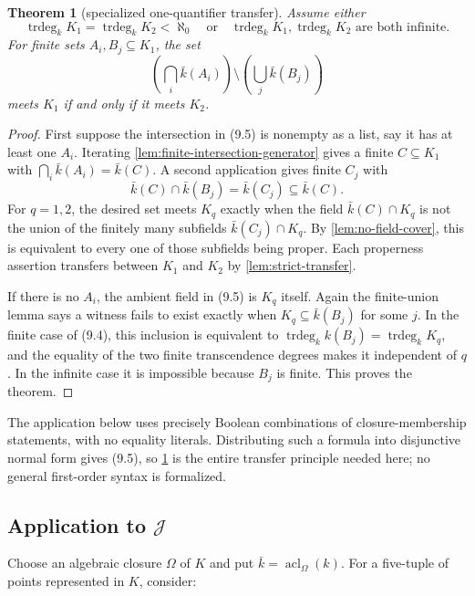 \documentclass[11pt,oneside]{article}
\newtheorem{theorem}{Theorem}[section]
\theoremstyle{definition}
\theoremstyle{remark}
\newcommand{\acl}{\operatorname{acl}}
\newcommand{\trdeg}{\operatorname{trdeg}}
\newcommand{\Jrel}{\mathcal{J}}
\begin{document}
\begin{theorem}[specialized one-quantifier transfer]\label{thm:one-quantifier-transfer}
Assume either
\[
 \trdeg_kK_1=\trdeg_kK_2<\aleph_0
 \quad\text{or}\quad
 \trdeg_kK_1,\trdeg_kK_2\text{ are both infinite}.             \tag{9.4}
\]
For finite sets $A_i,B_j\subseteq K_1$, the set
\[
 \left(\bigcap_i\bar k(A_i)\right)\setminus
 \left(\bigcup_j\bar k(B_j)\right)                            \tag{9.5}
\]
meets $K_1$ if and only if it meets $K_2$.
\end{theorem}
\begin{proof}
First suppose the intersection in (9.5) is nonempty as a list, say it has at least one
$A_i$.  Iterating \cref{lem:finite-intersection-generator} gives a finite $C\subseteq K_1$
with $\bigcap_i\bar k(A_i)=\bar k(C)$.  A second application gives finite $C_j$ with
\[
 \bar k(C)\cap\bar k(B_j)=\bar k(C_j)\subseteq\bar k(C).
\]
For $q=1,2$, the desired set meets $K_q$ exactly when the field
$\bar k(C)\cap K_q$ is not the union of the finitely many subfields
$\bar k(C_j)\cap K_q$.  By \cref{lem:no-field-cover}, this is equivalent to every one
of those subfields being proper.  Each properness assertion transfers between $K_1$ and
$K_2$ by \cref{lem:strict-transfer}.

If there is no $A_i$, the ambient field in (9.5) is $K_q$ itself.  Again the finite-union
lemma says a witness fails to exist exactly when
$K_q\subseteq\bar k(B_j)$ for some $j$.  In the finite case of (9.4), this inclusion is
equivalent to
$\trdeg_k k(B_j)=\trdeg_kK_q$, and the equality of the two finite transcendence degrees
makes it independent of $q$.  In the infinite case it is impossible because $B_j$ is
finite.  This proves the theorem.
\end{proof}

The application below uses precisely Boolean combinations of closure-membership
statements, with no equality literals.  Distributing such a formula into disjunctive
normal form gives (9.5), so \cref{thm:one-quantifier-transfer} is the entire transfer
principle needed here; no general first-order syntax is formalized.

\subsection[Application to J]{Application to $\Jrel$}

Choose an algebraic closure $\Omega$ of $K$ and put
$\bar k=\acl_\Omega(k)$.  For a five-tuple of points represented in $K$, consider:
\end{document}
